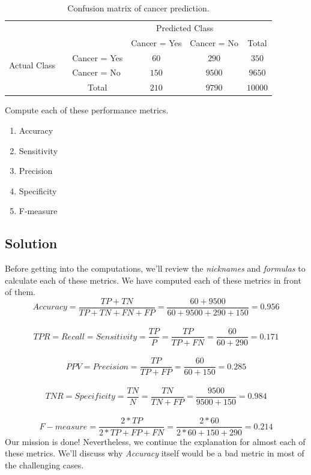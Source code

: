 \documentclass[12pt]{article}
\numberwithin{equation}{section}
\numberwithin{table}{section}
\numberwithin{figure}{section}
\begin{document}
\def\arraystretch{1.5}
\begin{table}[!h]
	\centering
	\begin{tabular}{l|l|c|c|c}
		\multicolumn{2}{c}{}&\multicolumn{2}{c}{Predicted Class}&\\
		\cline{3-4}
		\multicolumn{2}{c|}{}&Cancer = Yes&Cancer = No&\multicolumn{1}{c}{Total}\\
		\cline{2-4}
		\multirow{2}{*}{Actual Class\ \ }& Cancer = Yes & $60$ & $290$ & $350$\\
		\cline{2-4}
		& Cancer = No & $150$ & $9500$ & $9650$\\
		\cline{2-4}
		\multicolumn{1}{c}{} & \multicolumn{1}{c}{Total} & \multicolumn{1}{c}{$210$} & \multicolumn{    1}{c}{$9790$} & \multicolumn{1}{c}{$10000$}\\
	\end{tabular}
	\caption{Confusion matrix of cancer prediction.}
\end{table} 
Compute each of these performance metrics.
\begin{enumerate}[label=(\alph*)]
	\item Accuracy
	\item Sensitivity
	\item Precision
	\item Specificity
	\item F-measure
\end{enumerate}

\subsection*{Solution}
Before getting into the computations, we'll review the \textit{nicknames} and \textit{formulas} to calculate each of these metrics. We have computed each of these metrics in front of them.\\
\begin{equation}
	Accuracy = \frac{TP + TN}{TP + TN + FN + FP} = \frac{60 + 9500}{60 + 9500 + 290 + 150} = 0.956
\end{equation}
\\
\begin{equation}
	TPR = Recall = Sensitivity = \frac{TP}{P} = \frac{TP}{TP + FN} = \frac{60}{60 + 290} = 0.171
\end{equation}
\\
\begin{equation}
	PPV = Precision = \frac{TP}{TP + FP} = \frac{60}{60+150} = 0.285
\end{equation}
\\
\begin{equation}
	TNR = Specificity = \frac{TN}{N} = \frac{TN}{TN + FP} = \frac{9500}{9500+150} = 0.984
\end{equation}
\\
\begin{equation}
	F-measure = \frac{2*TP}{2*TP + FP + FN} = \frac{2*60}{2*60 + 150 + 290} = 0.214
\end{equation}
Our mission is done! Nevertheless, we continue the explanation for almost each of these metrics. We'll discuss why \textit{Accuracy} itself would be a bad metric in most of the challenging cases.
\end{document}
